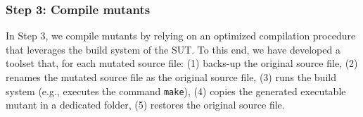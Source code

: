 \subsubsection{Step 3: Compile mutants}
%
In Step 3, we
compile mutants by relying on an optimized compilation procedure that leverages the build system of the SUT. To this end, we have developed a toolset that, for each mutated source file: (1) backs-up the original source file, (2) renames the mutated source file as the original source file, (3) runs the build system (e.g., executes the command \texttt{make}), (4) copies the generated executable mutant in a dedicated folder, (5) restores the original source file.
%
%
%
